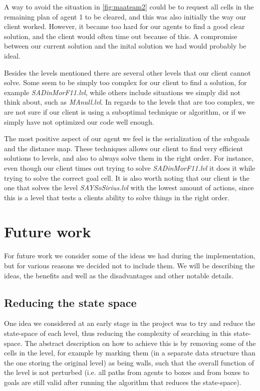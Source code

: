 \documentclass[letterpaper]{article}
\begin{document}
A way to avoid the situation in \ref{fig:maateam2} could be to request all cells in the remaining plan of agent 1 to be cleared, and this was also initially the way our client worked. However, it became too hard for our agents to find a good clear solution, and the client would often time out because of this. A compromise between our current solution and the inital solution we had would probably be ideal.

Besides the levels mentioned there are several other levels that our client cannot solve. Some seem to be simply too complex for our client to find a solution, for example \textit{SADinMorF11.lvl}, while others include situations we simply did not think about, such as \textit{MAnull.lvl}. In regards to the levels that are too complex, we are not sure if our client is using a suboptimal technique or algorithm, or if we simply have not optimized our code well enough.

The most positive aspect of our agent we feel is the serialization of the subgoals and the distance map. These techniques allows our client to find very efficient solutions to levels, and also to always solve them in the right order. For instance, even though our client times out trying to solve \textit{SADinMorF11.lvl} it does it while trying to solve the correct goal cell. It is also worth noting that our client is the one that solves the level \textit{SAYSoSirius.lvl} with the lowest amount of actions, since this is a level that tests a clients ability to solve things in the right order.

\section{Future work}
For future work we consider some of the ideas we had during the implementation, but for various reasons we decided not to include them. We will be describing the ideas, the benefits and well as the disadvantages and other notable details.

\subsection{Reducing the state space}
One idea we considered at an early stage in the project was to try and reduce the state-space of each level, thus reducing the complexity of searching in this state-space. The abstract description on how to achieve this is by removing some of the cells in the level, for example by marking them (in a separate data structure than the one storing the original level) as being walls, such that the overall function of the level is not perturbed (i.e. all paths from agents to boxes and from boxes to goals are still valid after running the algorithm that reduces the state-space).
\end{document}
